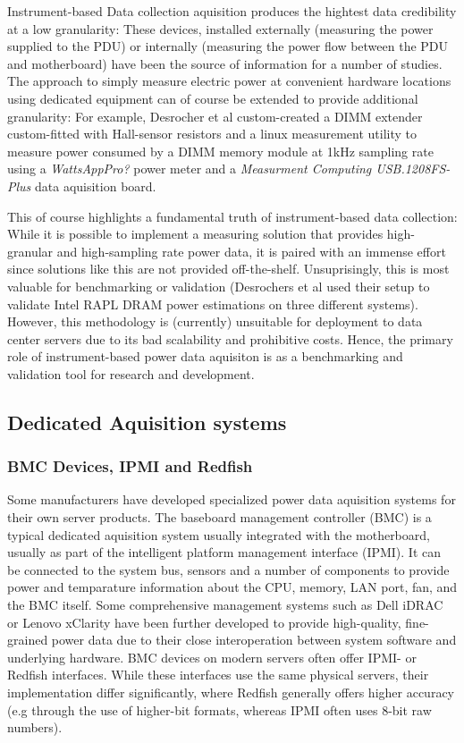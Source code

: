 Instrument-based Data collection aquisition produces the hightest data credibility at a low granularity: These devices, installed externally (measuring the power supplied to the PDU) or internally (measuring the power flow between the PDU and motherboard) have been the source of information for a number of studies. The approach to simply measure electric power at convenient hardware locations using dedicated equipment can of course be extended to provide additional granularity: For example, Desrocher et al\parencite{desrochers2016validation} custom-created a DIMM extender custom-fitted with Hall-sensor resistors and a linux measurement utility to measure power consumed by a DIMM memory module at 1kHz sampling rate using a \textit{WattsAppPro?} power meter and a \textit{Measurment Computing USB.1208FS-Plus} data aquisition board.

This of course highlights a fundamental truth of instrument-based data collection: While it is possible to implement a measuring solution that provides high-granular and high-sampling rate power data, it is paired with an immense effort since solutions like this are not provided off-the-shelf. Unsuprisingly, this is most valuable for benchmarking or validation (Desrochers et al used their setup to validate Intel RAPL DRAM power estimations on three different systems). However, this methodology is (currently) unsuitable for deployment to data center servers due to its bad scalability and prohibitive costs. Hence, the primary role of instrument-based power data aquisiton is as a benchmarking and validation tool for research and development.

\subsection{Dedicated Aquisition systems}

\subsubsection{BMC Devices, IPMI and Redfish}
Some manufacturers have developed specialized power data aquisition systems for their own server products. The baseboard management controller (BMC) is a typical dedicated aquisition system usually integrated with the motherboard, usually as part of the intelligent platform management interface (IPMI)\parencite{lin2020taxonomy}. It can be connected to the system bus, sensors and a number of components to provide power and temparature information about the CPU, memory, LAN port, fan, and the BMC itself. Some comprehensive management systems such as Dell iDRAC or Lenovo xClarity have been further developed to provide high-quality, fine-grained power data due to their close interoperation between system software and underlying hardware. BMC devices on modern servers often offer IPMI- or Redfish interfaces. While these interfaces use the same physical servers, their implementation differ significantly, where Redfish generally offers higher accuracy (e.g through the use of higher-bit formats, whereas IPMI often uses 8-bit raw numbers).

